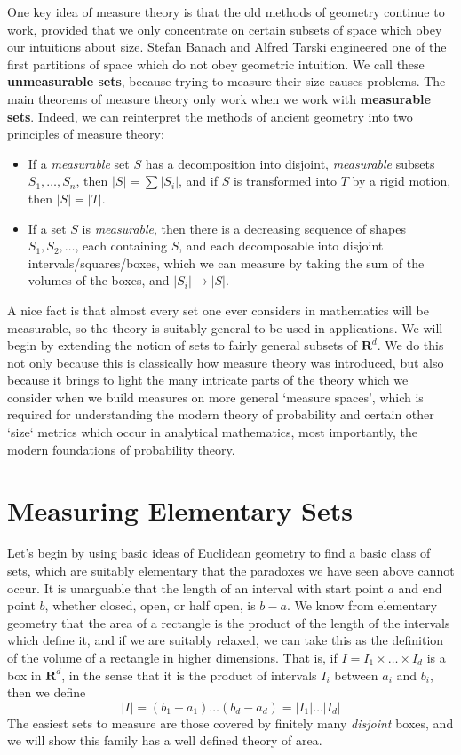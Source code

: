 %
One key idea of measure theory is that the old methods of geometry continue to work, provided that we only concentrate on certain subsets of space which obey our intuitions about size. Stefan Banach and Alfred Tarski engineered one of the first partitions of space which do not obey geometric intuition. We call these {\bf unmeasurable sets}, because trying to measure their size causes problems. The main theorems of measure theory only work when we work with {\bf measurable sets}. Indeed, we can reinterpret the methods of ancient geometry into two principles of measure theory:
%
\begin{itemize}
    \item If a {\it measurable} set $S$ has a decomposition into disjoint, {\it measurable} subsets $S_1, \dots, S_n$, then $|S| = \sum |S_i|$, and if $S$ is transformed into $T$ by a rigid motion, then $|S| = |T|$.

    \item If a set $S$ is {\it measurable}, then there is a decreasing sequence of shapes $S_1, S_2, \dots$, each containing $S$, and each decomposable into disjoint intervals/squares/boxes, which we can measure by taking the sum of the volumes of the boxes, and $|S_i| \to |S|$.
\end{itemize}
%
A nice fact is that almost every set one ever considers in mathematics will be measurable, so the theory is suitably general to be used in applications. We will begin by extending the notion of sets to fairly general subsets of $\mathbf{R}^d$. We do this not only because this is classically how measure theory was introduced, but also because it brings to light the many intricate parts of the theory which we consider when we build measures on more general `measure spaces', which is required for understanding the modern theory of probability and certain other `size` metrics which occur in analytical mathematics, most importantly, the modern foundations of probability theory.

\section{Measuring Elementary Sets}

Let's begin by using basic ideas of Euclidean geometry to find a basic class of sets, which are suitably elementary that the paradoxes we have seen above cannot occur. It is unarguable that the length of an interval with start point $a$ and end point $b$, whether closed, open, or half open, is $b - a$. We know from elementary geometry that the area of a rectangle is the product of the length of the intervals which define it, and if we are suitably relaxed, we can take this as the definition of the volume of a rectangle in higher dimensions. That is, if $I = I_1 \times \dots \times I_d$ is a box in $\mathbf{R}^d$, in the sense that it is the product of intervals $I_i$ between $a_i$ and $b_i$, then we define
%
\[ |I| = (b_1 - a_1) \dots (b_d - a_d) = |I_1| \dots |I_d| \]
%
The easiest sets to measure are those covered by finitely many {\it disjoint} boxes, and we will show this family has a well defined theory of area.

